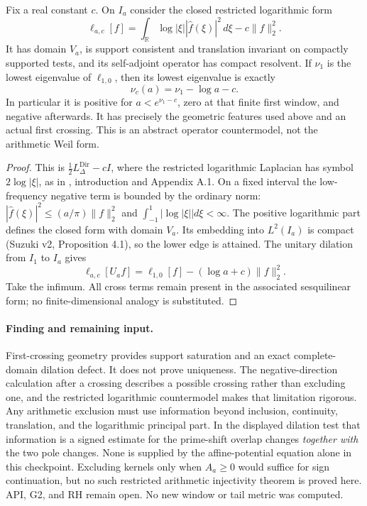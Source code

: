 \begin{proposition}\label{prop:ns55fc-countermodel}
Fix a real constant $c$. On $I_a$ consider the closed restricted
logarithmic form
\[
 \ell_{a,c}[f]=\int_{\mathbb R}\log|\xi|
                     |\widehat f(\xi)|^2\,d\xi-c\|f\|_2^2.
\]
It has domain $V_a$, is support consistent and translation invariant
on compactly supported tests, and its self-adjoint operator has
compact resolvent. If $\nu_1$ is the lowest eigenvalue of
$\ell_{1,0}$, then its lowest eigenvalue is exactly
\begin{equation}\label{eq:ns55fc-model-crossing}
 \nu_c(a)=\nu_1-\log a-c.
\end{equation}
In particular it is positive for $a<e^{\nu_1-c}$, zero at that
finite first window, and negative afterwards. It has precisely
the geometric features used above and an actual first crossing.
This is an abstract operator countermodel, not the arithmetic Weil form.
\end{proposition}
\begin{proof}
This is $\tfrac12L_\Delta^{\mathrm{Dir}}-cI$, where the restricted
logarithmic Laplacian has symbol $2\log|\xi|$, as in
\cite{HLSLogBoundary}, introduction and Appendix A.1.
On a fixed interval the low-frequency negative term is bounded by
the ordinary norm: $|\widehat f(\xi)|^2\le(a/\pi)\|f\|_2^2$
and $\int_{-1}^1|\log|\xi||d\xi<\infty$. The positive logarithmic
part defines the closed form with domain $V_a$. Its embedding into
$L^2(I_a)$ is compact (Suzuki v2, Proposition 4.1), so the lower
edge is attained. The unitary dilation from $I_1$ to $I_a$ gives
\[
 \ell_{a,c}[U_af]
     =\ell_{1,0}[f]-(\log a+c)\|f\|_2^2.
\]
Take the infimum. All cross terms remain present in the associated
sesquilinear form; no finite-dimensional analogy is substituted.
\end{proof}

\paragraph{Finding and remaining input.}
First-crossing geometry provides support saturation and an exact
complete-domain dilation defect. It does not prove uniqueness. The
negative-direction calculation after a crossing describes a possible
crossing rather than excluding one, and the restricted logarithmic
countermodel makes that limitation rigorous. Any arithmetic exclusion
must use information beyond inclusion, continuity, translation, and
the logarithmic principal part. In the displayed dilation test that
information is a signed estimate for the prime-shift overlap changes
\emph{together with} the two pole changes. None is supplied by the
affine-potential equation alone in this checkpoint. Excluding kernels
only when $A_a\ge0$ would suffice for sign continuation, but no such
restricted arithmetic injectivity theorem is proved here. API, G2,
and RH remain open. No new window or tail metric was computed.
